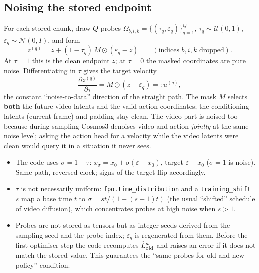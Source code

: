 \subsection{Noising the stored endpoint }
For each stored chunk, draw $Q$ probes $\Omega_{b,i,k}=\{(\tau_q,\varepsilon_q)\}_{q=1}^Q$, $\tau_q\sim\mathcal U(0,1)$, $\varepsilon_q\sim\mathcal N(0,I)$, and form
\begin{equation}
z^{(q)}=z+(1-\tau_q)\,M\odot(\varepsilon_q-z)\qquad(\text{indices }b,i,k\text{ dropped}).
\label{loop:eq:noise}
\end{equation}
At $\tau=1$ this is the clean endpoint $z$; at $\tau=0$ the masked coordinates are pure noise. Differentiating in $\tau$ gives the target velocity
\begin{equation}
\frac{\partial z^{(q)}}{\partial\tau}=M\odot(z-\varepsilon_q)=:u^{(q)},
\label{loop:eq:target}
\end{equation}
the constant ``noise-to-data'' direction of the straight path. The mask $M$ selects \textbf{both} the future video latents and the valid action coordinates; the conditioning latents (current frame) and padding stay clean. The video part is noised too because during sampling Cosmos3 denoises video and action \emph{jointly} at the same noise level; asking the action head for a velocity while the video latents were clean would query it in a situation it never sees.

\begin{codenote}
\begin{itemize}[leftmargin=*]
\item The code uses $\sigma=1-\tau$: $x_\sigma=x_0+\sigma(\varepsilon-x_0)$, target $\varepsilon-x_0$ ($\sigma=1$ is noise). Same path, reversed clock; signs of the target flip accordingly.
\item $\tau$ is not necessarily uniform: \texttt{fpo.time\_distribution} and a \texttt{training\_shift} $s$ map a base time $t$ to $\sigma=st/(1+(s-1)t)$ (the usual ``shifted'' schedule of video diffusion), which concentrates probes at high noise when $s>1$.
\item Probes are not stored as tensors but as integer seeds derived from the sampling seed and the probe index; $\varepsilon_q$ is regenerated from them. Before the first optimiser step the code recomputes $\hat L^{a}_{\mathrm{old}}$ and raises an error if it does not match the stored value. This guarantees the ``same probes for old and new policy'' condition.
\end{itemize}
\end{codenote}


